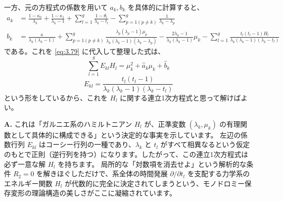 \begin{story}
\begin{theorem}
一方、元の方程式の係数を用いて $a_k, b_k$ を具体的に計算すると、
\begin{align*}
    a_k &= \frac{1-\kappa_0}{\lambda_k} + \frac{1-\kappa_1}{\lambda_k-1} + \sum_{l=1}^g \frac{1-\theta_l}{\lambda_k-t_l} - \sum_{p=1(p \neq k)}^g \frac{1}{\lambda_k-\lambda_p} \\
    b_k &= \frac{\kappa}{\lambda_k(\lambda_k-1)} + \sum_{p=1(p \neq k)}^g \frac{\lambda_p(\lambda_p-1)\mu_p}{\lambda_k(\lambda_k-1)(\lambda_k-\lambda_p)} - \frac{2\lambda_k-1}{\lambda_k(\lambda_k-1)}\mu_k - \sum_{l=1}^g \frac{t_l(t_l-1)H_l}{\lambda_k(\lambda_k-1)(\lambda_k-t_l)}
\end{align*}
である。これを \eqref{eq:3.79} に代入して整理した式は、
\begin{equation}
    \sum_{l=1}^g E_{kl} H_l = \mu_k^2 + \hat{a}_k \mu_k + \hat{b}_k \label{eq:3.80}
\end{equation}
\begin{equation*}
    E_{kl} = \frac{t_l(t_l-1)}{\lambda_k(\lambda_k-1)(\lambda_k-t_l)}
\end{equation*}
という形をしているから、これを $H_l$ に関する連立1次方程式と思って解けばよい。
\end{theorem}
\end{story}

\begin{Q}
\textbf{A.} これは「ガルニエ系のハミルトニアン $H_l$ が、正準変数 $(\lambda_k, \mu_k)$ の有理関数として具体的に構成できる」という決定的な事実を示しています。
左辺の係数行列 $E_{kl}$ はコーシー行列の一種であり、$\lambda_k$ と $t_l$ がすべて相異なるという仮定のもとで正則（逆行列を持つ）になります。したがって、この連立1次方程式は必ず一意な解 $H_l$ を持ちます。
局所的な「対数項を消去せよ」という解析的な条件 $R_2=0$ を解きほぐしただけで、系全体の時間発展 $\partial/\partial t_l$ を支配する力学系のエネルギー関数 $H_l$ が代数的に完全に決定されてしまうという、モノドロミー保存変形の理論構造の美しさがここに凝縮されています。
\end{Q}

